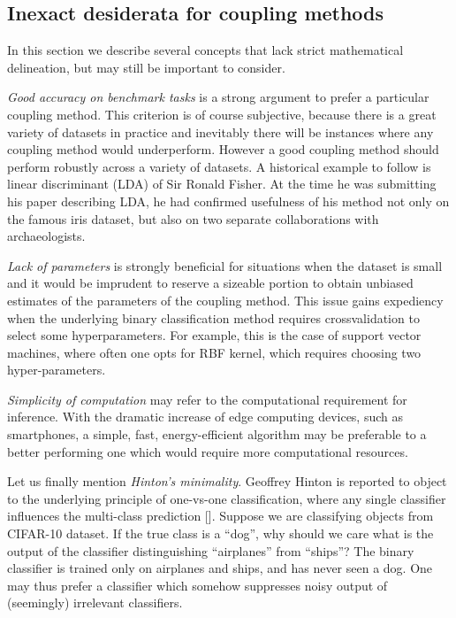\documentclass[twoside,11pt]{article}
\begin{document}
\subsection{Inexact desiderata for coupling methods}

\label{sec:des:inexact}

In this section we describe several concepts that lack strict mathematical delineation, but may still be important to consider.

\emph{Good accuracy on benchmark tasks} is  a strong argument to prefer a particular coupling method. This criterion is of course subjective, because there is a great variety of datasets in practice and inevitably there will be instances where any coupling method would underperform. However a good coupling method should perform robustly across a variety of datasets. A historical  example to follow is linear discriminant (LDA) of  Sir Ronald Fisher. At the time he was submitting his paper describing LDA, he had confirmed usefulness of his method not only on the famous iris dataset, but also on two separate collaborations with archaeologists. 

\emph{Lack of parameters} is strongly beneficial for situations when the dataset is small and it would be imprudent to reserve a sizeable portion to obtain unbiased estimates of the parameters of the coupling method. This issue gains expediency when the underlying binary classification method requires crossvalidation to select some hyperparameters. For example, this is the case of support vector machines, where often one opts for RBF kernel, which requires choosing two hyper-parameters. 

\emph{Simplicity of computation}  may refer to the computational requirement for inference. With the dramatic increase of edge computing devices, such as smartphones, a simple, fast, energy-efficient algorithm may be preferable to a better performing one which would require more computational resources. 

Let us finally mention \emph{Hinton's minimality}. Geoffrey Hinton is reported to object to the underlying principle of one-vs-one classification, where any single classifier influences the multi-class prediction [\cite[p.~467]{hastie1998classification}]. Suppose we are classifying objects from CIFAR-10 dataset.  If the true class is  a ``dog'', why should we care what is the output of the classifier distinguishing ``airplanes'' from ``ships''? The binary classifier is trained only on airplanes and ships, and has never seen a dog. One may thus prefer a classifier which somehow suppresses noisy output of (seemingly) irrelevant classifiers.
\end{document}
